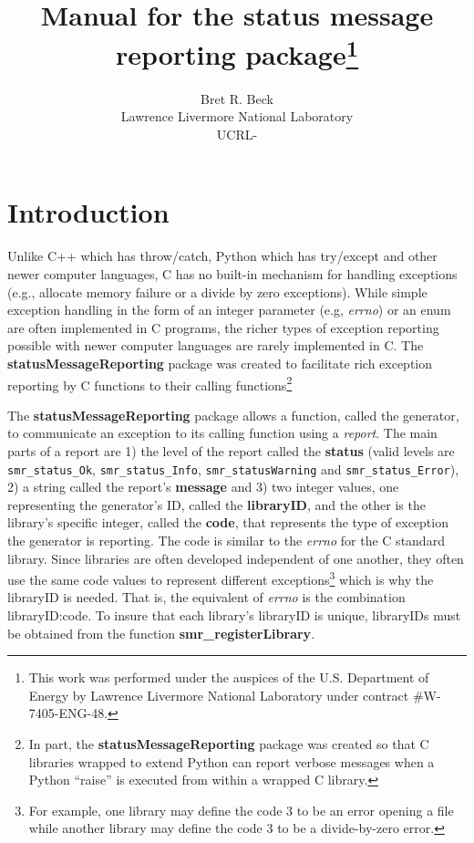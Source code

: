 \documentclass[11pt]{article}
\title{Manual for the status message reporting package\footnote{
This work was performed under the auspices of the U.S. Department of Energy by
Lawrence Livermore National Laboratory under contract \#W-7405-ENG-48.}}
\author{{Bret R. Beck}\\Lawrence Livermore National Laboratory\\UCRL-}
\begin{document}
\maketitle
\pagebreak
\tableofcontents
\listoftables
\pagebreak

\section{Introduction}
Unlike C++ which has throw/catch,
Python which has try/except and other newer computer languages, C has no built-in mechanism for handling exceptions
(e.g., allocate memory failure or a divide by zero exceptions). While simple exception handling in the form of an
integer parameter (e.g, \textit{errno}) or an enum are often implemented in C programs, the richer types of exception reporting
possible with newer computer languages are rarely implemented in C. The \textbf{statusMessageReporting} 
package was created to facilitate
rich exception reporting by C functions to their calling functions\footnote{In part, the \textbf{statusMessageReporting} package 
was created so that
C libraries wrapped to extend Python can report verbose messages when a Python ``raise'' is executed from within a
wrapped C library.}

The \textbf{statusMessageReporting} package allows a function, called the generator,
to communicate an exception to its calling function using a \textit{report}. 
The main parts of a report are 1) the level of the report called the \textbf{status} (valid levels are \texttt{smr\_status\_Ok}, 
\texttt{smr\_status\_Info}, \texttt{smr\_status\-Warning} and \texttt{smr\_status\_Error}), 
2) a string called the report's \textbf{message} and 3) two integer values, one representing the generator's ID, called the
\textbf{libraryID}, and the other is the library's specific integer, called the \textbf{code}, 
that represents the type of exception the generator is reporting.
The code is similar to the \textit{errno} for the C standard library.
Since libraries are often developed independent of one another, they often use the same code values to
represent different exceptions\footnote{For example, one library may define the code 3 to be an error opening a file while another library
may define the code 3 to be a divide-by-zero error.} which is why the libraryID is needed. That is,
the equivalent of \textit{errno} is the combination libraryID:code. 
To insure that each library's libraryID is unique, libraryIDs
must be obtained from the function \textbf{smr\_registerLibrary}.
\end{document}
